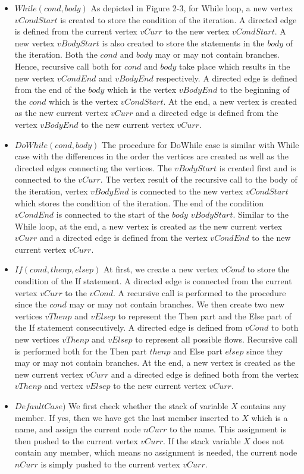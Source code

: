 \begin{itemize}
\item $While(cond,body)$
As depicted in Figure 2-3, for While loop, a new vertex $vCondStart$ is created to store the condition of the iteration. A directed edge is defined from the current vertex $vCurr$ to the new vertex $vCondStart$. A new vertex $vBodyStart$ is also created to store the statements in the $body$ of the iteration. Both the $cond$ and $body$ may or may not contain branches. Hence, recursive call both for $cond$ and $body$ take place which results in the new vertex $vCondEnd$ and $vBodyEnd$ respectively. A directed edge is defined from the end of the $body$ which is the vertex $vBodyEnd$ to the beginning of the $cond$ which is the vertex $vCondStart$. At the end, a new vertex is created as the new current vertex $vCurr$ and a directed edge is defined from the vertex $vBodyEnd$ to the new current vertex $vCurr$. 

\item $DoWhile(cond,body)$
The procedure for DoWhile case is similar with While case with the differences in the order the vertices are created as well as the directed edges connecting the vertices. The $vBodyStart$ is created first and is connected to the $vCurr$. The vertex result of the recursive call to the body of the iteration, vertex $vBodyEnd$ is connected to the new vertex $vCondStart$ which stores the condition of the iteration. The end of the condition $vCondEnd$ is connected to the start of the $body$ $vBodyStart$. Similar to the While loop, at the end, a new vertex is created as the new current vertex $vCurr$ and a directed edge is defined from the vertex $vCondEnd$ to the new current vertex $vCurr$. 

\item $If(cond,thenp,elsep)$
At first, we create a new vertex $vCond$ to store the condition of the If statement. A directed edge is connected from the current vertex $vCurr$ to the $vCond$. A recursive call is performed to the procedure since the $cond$ may or may not contain branches. We then create two new vertices $vThenp$ and $vElsep$ to represent the Then part and the Else part of the If statement consecutively. A directed edge is defined from $vCond$ to both new vertices $vThenp$ and $vElsep$ to represent all possible flows. Recursive call is performed both for the Then part $thenp$ and Else part $elsep$ since they may or may not contain branches. At the end, a new vertex is created as the new current vertex $vCurr$ and a directed edge is defined both from the vertex $vThenp$ and vertex $vElsep$ to the new current vertex $vCurr$. 

\item $Default Case)$
We first check whether the stack of variable $X$ contains any member. If yes, then we have get the last member inserted to $X$ which is a name, and assign the current node $nCurr$ to the name. This assignment is then pushed to the current vertex $vCurr$. If the stack variable $X$ does not contain any member, which means no assignment is needed, the current node $nCurr$ is simply pushed to the current vertex $vCurr$. 
\end{itemize}

